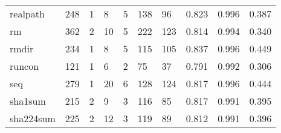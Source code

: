 \begin{longtable}{lp{1.3cm}p{1.3cm}p{1.3cm}p{1.3cm}p{1.3cm}p{1.3cm}p{1.3cm}p{1.3cm}p{1.3cm}}
realpath  &                    248 &                                  1 &                                 8 &                                5 &                               138 &                              96 &                                   0.823 &                                  0.996 &                                0.387 \\
rm        &                    362 &                                  2 &                                10 &                                5 &                               222 &                             123 &                                   0.814 &                                  0.994 &                                0.340 \\
rmdir     &                    234 &                                  1 &                                 8 &                                5 &                               115 &                             105 &                                   0.837 &                                  0.996 &                                0.449 \\
runcon    &                    121 &                                  1 &                                 6 &                                2 &                                75 &                              37 &                                   0.791 &                                  0.992 &                                0.306 \\
seq       &                    279 &                                  1 &                                20 &                                6 &                               128 &                             124 &                                   0.817 &                                  0.996 &                                0.444 \\
sha1sum   &                    215 &                                  2 &                                 9 &                                3 &                               116 &                              85 &                                   0.817 &                                  0.991 &                                0.395 \\
sha224sum &                    225 &                                  2 &                                12 &                                3 &                               119 &                              89 &                                   0.812 &                                  0.991 &                                0.396 \\

\end{longtable}
